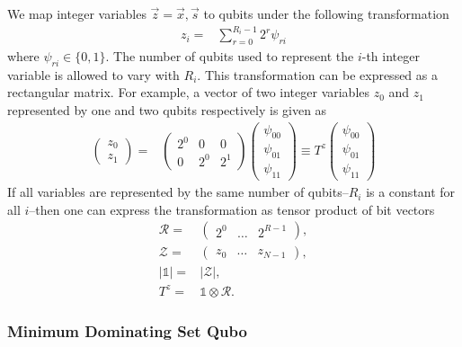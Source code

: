 \documentclass[prd,twocolumn,tightenlines,preprintnumbers,showpacs,superscriptaddress,notitlepage,nofootinbib,eqsecnum,floatfix,longbibliography,aps,10pt]{revtex4-2}
\begin{document}
We map integer variables $\vec z = \vec x, \vec s$ to qubits under the following transformation~\cite{Chang:2018uoc}
\begin{align}
 z_i = & \sum_{r=0}^{R_i-1} 2^r \psi_{ri}
 \label{eq:int_to_bin}
\end{align}
where $\psi_{ri} \in \{0, 1\}$.
The number of qubits used to represent the $i$-th integer variable is allowed to vary with $R_i$.
This transformation can be expressed as a rectangular matrix.
For example, a vector of two integer variables $z_0$ and $z_1$ represented by one and two qubits respectively is given as
\begin{align}
 \begin{pmatrix}
  z_0 \\
  z_1
 \end{pmatrix}
 = &
 \begin{pmatrix}
  2^0 & 0   & 0   \\
  0   & 2^0 & 2^1
 \end{pmatrix}
 \begin{pmatrix}
  \psi_{00} \\
  \psi_{01} \\
  \psi_{11}
 \end{pmatrix}
 \equiv T^z \begin{pmatrix}
  \psi_{00} \\
  \psi_{01} \\
  \psi_{11}
 \end{pmatrix}
\end{align}
If all variables are represented by the same number of qubits--$R_i$ is a constant for all $i$--then one can express the transformation as tensor product of bit vectors
\begin{align}
 \mathcal{R} =  & \begin{pmatrix} 2^0 & \dots & 2^{R-1}\end{pmatrix},    \\
 \mathcal{Z} =  & \begin{pmatrix} z_0 & \dots & z_{N-1}\end{pmatrix},    \\
 |\mathds{1}| = & |\mathcal{Z}|,                 \\
 T^z =          & \mathds{1}\otimes \mathcal{R}.
\end{align}

\subsubsection{Minimum Dominating Set Qubo}
\label{sec:methods:mds-qubo}
\end{document}
